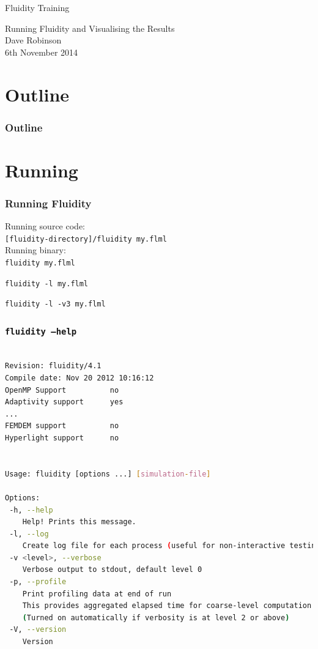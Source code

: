 \documentclass[12pt]{beamer}
\begin{document}
 
\begin{frame}{Fluidity Training}
  \begin{center}
  {\Large Running Fluidity and Visualising the Results}
  \vspace{1.5cm}\\
  \large Dave Robinson\\
  \vspace{0.2cm}
  6th November 2014
  \end{center}
\end{frame}

\section*{Outline}
\begin{frame}
  \frametitle{Outline}
  \tableofcontents
\end{frame}

\section{Running}
\begin{frame}
    \frametitle{Running Fluidity}

    Running source code:\\
\texttt{[fluidity-directory]/fluidity my.flml}\\    
\vspace{1ex}    
    Running binary:\\
\texttt{fluidity my.flml}

\texttt{fluidity -l my.flml}

\texttt{fluidity -l -v3 my.flml}

\end{frame}


\begin{frame}[fragile]
    \frametitle{{\tt fluidity --help}}
\lstset{language=bash,basicstyle=\tiny}
\begin{lstlisting}[language=bash]

Revision: fluidity/4.1
Compile date: Nov 20 2012 10:16:12
OpenMP Support			no
Adaptivity support		yes
...
FEMDEM support			no
Hyperlight support		no


Usage: fluidity [options ...] [simulation-file]

Options:
 -h, --help
	Help! Prints this message.
 -l, --log
	Create log file for each process (useful for non-interactive testing).
 -v <level>, --verbose
	Verbose output to stdout, default level 0
 -p, --profile
	Print profiling data at end of run
	This provides aggregated elapsed time for coarse-level computation
	(Turned on automatically if verbosity is at level 2 or above)
 -V, --version
	Version
\end{lstlisting}
\end{frame}
\end{document}
